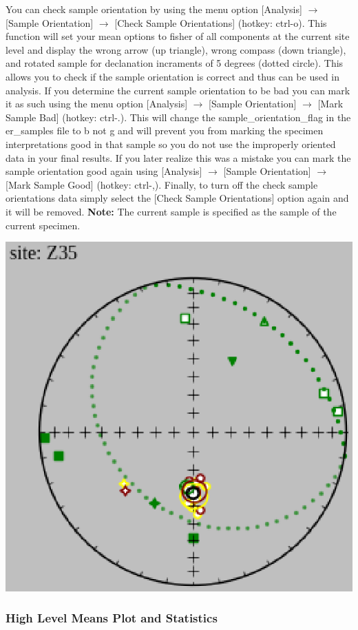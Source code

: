\documentclass[11pt]{book}
\begin{document}
{{You can check sample orientation by using the menu option [Analysis] $\rightarrow$ [Sample Orientation] $\rightarrow$ [Check Sample Orientations] (hotkey: ctrl-o). This function will set your mean options to fisher of all components at the current site level and display the wrong arrow (up triangle), wrong compass (down triangle), and rotated sample for declanation incraments of 5 degrees (dotted circle). This allows you to check if the sample orientation is correct and thus can be used in analysis. If you determine the current sample orientation to be bad you can mark it as such using the menu option [Analysis] $\rightarrow$ [Sample Orientation] $\rightarrow$ [Mark Sample Bad] (hotkey: ctrl-.). This will change the sample_orientation_flag in the er_samples file to b not g and will prevent you from marking the specimen interpretations good in that sample so you do not use the improperly oriented data in your final results. If you later realize this was a mistake you can mark the sample orientation good again using [Analysis] $\rightarrow$ [Sample Orientation] $\rightarrow$ [Mark Sample Good] (hotkey: ctrl-,). Finally, to turn off the check sample orientations data simply select the [Check Sample Orientations] option again and it will be removed. \textbf{Note:} The current sample is specified as the sample of the current specimen.

\includegraphics[width=10 cm]{EPSFiles/demag_gui_CheckSampleOrient.eps}

\subsubsection{High Level Means Plot and
Statistics}\label{higher-level-plots-and-interpretation}

}}
\end{document}
